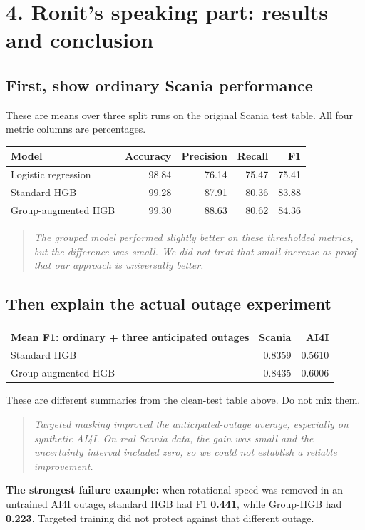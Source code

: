 \documentclass[11pt,a4paper]{article}
\newcommand{\say}[1]{\begin{quote}\itshape #1\end{quote}}
\begin{document}
\newpage
\section*{4. Ronit's speaking part: results and conclusion}
\subsection*{First, show ordinary Scania performance}
These are means over three split runs on the original Scania test table. All four metric columns are percentages.
\begin{center}\small
\begin{tabular}{lrrrr}\toprule
Model & Accuracy & Precision & Recall & F1\\\midrule
Logistic regression & 98.84 & 76.14 & 75.47 & 75.41\\
Standard HGB & 99.28 & 87.91 & 80.36 & 83.88\\
Group-augmented HGB & 99.30 & 88.63 & 80.62 & 84.36\\\bottomrule
\end{tabular}
\end{center}
\say{The grouped model performed slightly better on these thresholded metrics, but the difference was small. We did not treat that small increase as proof that our approach is universally better.}

\subsection*{Then explain the actual outage experiment}
\begin{center}\small
\begin{tabular}{lrr}\toprule
Mean F1: ordinary + three anticipated outages & Scania & AI4I\\\midrule
Standard HGB & 0.8359 & 0.5610\\
Group-augmented HGB & 0.8435 & 0.6006\\\bottomrule
\end{tabular}
\end{center}
These are different summaries from the clean-test table above. Do not mix them.

\say{Targeted masking improved the anticipated-outage average, especially on synthetic AI4I. On real Scania data, the gain was small and the uncertainty interval included zero, so we could not establish a reliable improvement.}

\textbf{The strongest failure example:} when rotational speed was removed in an untrained AI4I outage, standard HGB had F1 \textbf{0.441}, while Group-HGB had \textbf{0.223}. Targeted training did not protect against that different outage.
\end{document}
